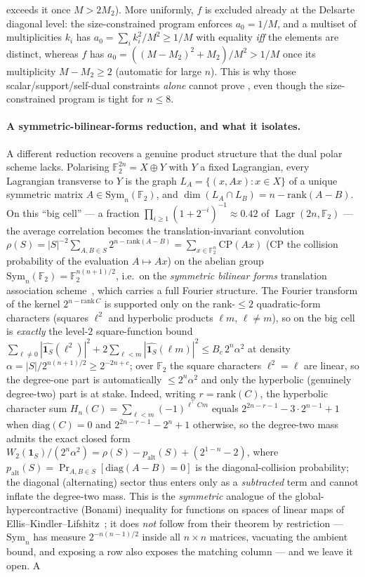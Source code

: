 \documentclass[11pt,a4paper]{article}
\theoremstyle{plain}
\theoremstyle{definition}
\newcommand{\F}{\mathbb{F}}
\DeclareMathOperator{\Lagr}{Lagr}
\begin{document}
exceeds it once $M>2M_2$). More uniformly, $f$ is excluded already at the Delsarte diagonal level: the size-constrained program enforces $a_0=1/M$, and a multiset of multiplicities $k_i$ has $a_0=\sum_i k_i^2/M^2\ge 1/M$ with equality \emph{iff} the elements are distinct, whereas $f$ has $a_0=((M-M_2)^2+M_2)/M^2>1/M$ once its multiplicity $M-M_2\ge 2$ (automatic for large $n$). This is why those scalar/support/self-dual constraints \emph{alone} cannot prove , even though the size-constrained program is tight for $n\le 8$.

\paragraph{A symmetric-bilinear-forms reduction, and what it isolates.} A different reduction recovers a genuine product structure that the dual polar scheme lacks. Polarising $\F_2^{2n}=X\oplus Y$ with $Y$ a fixed Lagrangian, every Lagrangian transverse to $Y$ is the graph $L_A=\{(x,Ax):x\in X\}$ of a unique symmetric matrix $A\in\mathrm{Sym}_n(\F_2)$, and $\dim(L_A\cap L_B)=n-\mathrm{rank}(A-B)$. On this ``big cell'' --- a fraction $\prod_{i\ge 1}(1+2^{-i})^{-1}\approx 0.42$ of $\Lagr(2n,\F_2)$ --- the average correlation becomes the translation-invariant convolution $\rho(S)=|S|^{-2}\sum_{A,B\in S}2^{n-\mathrm{rank}(A-B)}=\sum_{x\in\F_2^n}\mathrm{CP}(Ax)$ ($\mathrm{CP}$ the collision probability of the evaluation $A\mapsto Ax$) on the abelian group $\mathrm{Sym}_n(\F_2)=\F_2^{n(n+1)/2}$, i.e.\ on the \emph{symmetric bilinear forms} translation association scheme~\cite{Schmidt2018}, which carries a full Fourier structure. The Fourier transform of the kernel $2^{n-\mathrm{rank}\,C}$ is supported only on the rank-$\le 2$ quadratic-form characters (squares $\ell^2$ and hyperbolic products $\ell m$, $\ell\neq m$), so  on the big cell is \emph{exactly} the level-$2$ square-function bound $\sum_{\ell\neq 0}|\widehat{\mathbf 1_S}(\ell^2)|^2+2\sum_{\ell<m}|\widehat{\mathbf 1_S}(\ell m)|^2\le B_c\,2^n\alpha^2$ at density $\alpha=|S|/2^{n(n+1)/2}\ge 2^{-2n+c}$; over $\F_2$ the square characters $\ell^2=\ell$ are linear, so the degree-one part is automatically $\le 2^n\alpha^2$ and only the hyperbolic (genuinely degree-two) part is at stake. Indeed, writing $r=\mathrm{rank}(C)$, the hyperbolic character sum $H_n(C)=\sum_{\ell<m}(-1)^{\ell^{\top}Cm}$ equals $2^{2n-r-1}-3\cdot 2^{n-1}+1$ when $\mathrm{diag}(C)=0$ and $2^{2n-r-1}-2^n+1$ otherwise, so the degree-two mass admits the exact closed form $W_2(\mathbf 1_S)/(2^n\alpha^2)=\rho(S)-p_{\mathrm{alt}}(S)+(2^{1-n}-2)$, where $p_{\mathrm{alt}}(S)=\Pr_{A,B\in S}[\mathrm{diag}(A-B)=0]$ is the diagonal-collision probability; the diagonal (alternating) sector thus enters only as a \emph{subtracted} term and cannot inflate the degree-two mass. This is the \emph{symmetric} analogue of the global-hypercontractive (Bonami) inequality for functions on spaces of linear maps of Ellis--Kindler--Lifshitz~\cite{EKL2022}; it does \emph{not} follow from their theorem by restriction --- $\mathrm{Sym}_n$ has measure $2^{-n(n-1)/2}$ inside all $n\times n$ matrices, vacuating the ambient bound, and exposing a row also exposes the matching column --- and we leave it open. A 
\end{document}
